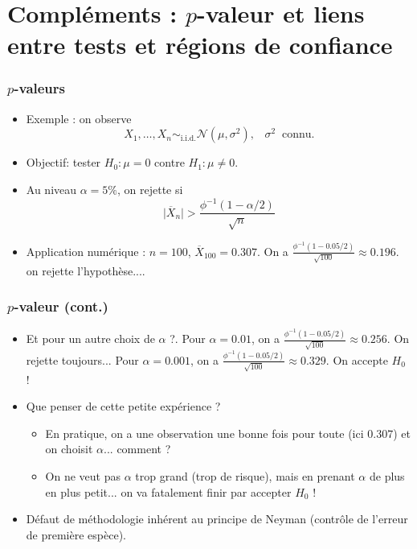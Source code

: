 \section{Compléments : $p$-valeur et liens entre tests et régions de confiance}

\begin{frame}
\frametitle{$p$-valeurs}
\begin{itemize}
\item \alert{Exemple} : on observe
$$X_1,\ldots, X_n\sim_{\text{i.i.d.}}{\mathcal N}(\mu,\sigma^2),\;\;\;\sigma^2\;\;\text{connu}.$$
\item \alert{Objectif}: tester $H_0:\mu=0$ contre $H_1:\mu\neq 0$.
\item Au niveau $\alpha=5\%$, on rejette si
$$\big| \overline{X}_n \big| > \frac{\phi^{-1}(1-\alpha/2)}{\sqrt{n}}$$
\item \alert{Application numérique} : $n=100$, $\overline{X}_{100}=0.307$. On a $\frac{\phi^{-1}(1-0.05/2)}{\sqrt{100}} \approx 0.196$. \alert{on rejette l'hypothèse...}.
\end{itemize}
\end{frame}

\begin{frame}
\frametitle{$p$-valeur (cont.)}
\begin{itemize}
\item \alert{Et pour un autre choix de $\alpha$ ?}. Pour $\alpha=0.01$, on a $\frac{\phi^{-1}(1-0.05/2)}{\sqrt{100}} \approx 0.256$. On rejette toujours... Pour $\alpha=0.001$, on a $\frac{\phi^{-1}(1-0.05/2)}{\sqrt{100}} \approx 0.329$. \alert{On accepte $H_0$ !}
\item Que penser de cette petite expérience ?
\begin{itemize}
\item En pratique, on a une observation une bonne fois pour toute (ici $0.307$) et on  choisit  $\alpha$... \alert{comment ?}
\item On ne veut pas $\alpha$ trop grand (trop de risque), mais en prenant $\alpha$ de plus en plus petit... on va \alert{ fatalement} finir par accepter $H_0$ !
\end{itemize}
\item Défaut de méthodologie inhérent au principe de Neyman (contrôle de l'erreur de première espèce).
\end{itemize}
\end{frame}



